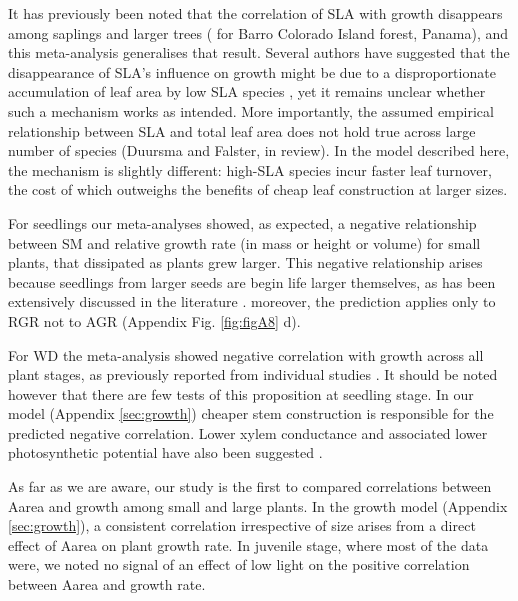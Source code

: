 \documentclass[a4paper,11pt]{article}
\begin{document}
It has previously been noted that the correlation of SLA with growth disappears among saplings and larger trees (\citealt{Wright:2010tp} for Barro Colorado Island forest, Panama), and this meta-analysis generalises that result. Several authors have suggested that the disappearance of SLA's influence on growth might be due to a disproportionate accumulation of leaf area by low SLA species \citep{Reich:1992wm,Poorter:2008iu,Wright:2010tp}, yet it remains unclear whether such a mechanism works as intended. More importantly, the assumed empirical relationship between SLA and total leaf area does not hold true across large number of species (Duursma and Falster, in review). In the model described here, the mechanism is slightly different: high-SLA species incur faster leaf turnover, the cost of which outweighs the benefits of cheap leaf construction at larger sizes.

For seedlings our meta-analyses showed, as expected, a negative relationship between SM and relative growth rate (in mass or height or volume) for small plants, that dissipated as plants grew larger. This negative relationship arises because seedlings from larger seeds are begin life larger themselves, as has been extensively discussed in the literature \citep[reviewed by][]{Turnbull:2012ew}. moreover, the prediction applies only to RGR not to AGR (Appendix Fig. \ref{fig:figA8} d).

For WD the meta-analysis showed negative correlation with growth across all plant stages, as previously reported from individual studies \citep{Wright:2010tp,Ruger:2012jv}. It should be noted however that there are few tests of this proposition at seedling stage. In our model (Appendix \ref{sec:growth}) cheaper stem construction is responsible for the predicted negative correlation. Lower xylem conductance and associated lower photosynthetic potential have also been suggested \citep[reviewed by][]{Chave:2009iy}.

As far as we are aware, our study is the first to compared correlations between Aarea and growth among small and large plants. In the growth model (Appendix \ref{sec:growth}), a consistent correlation irrespective of size arises from a direct effect of Aarea on plant growth rate. In juvenile stage, where most of the data were, we noted no signal of an effect of low light on the positive correlation between Aarea and growth rate.
\end{document}

